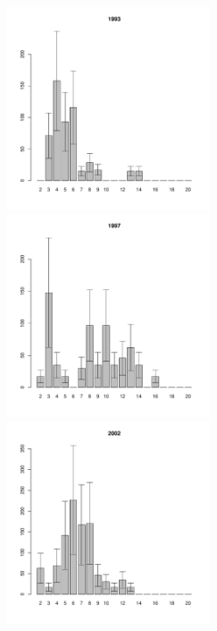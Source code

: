 \begin{figure}[hp]
\begin{minipage}[b]{.3\linewidth}
\begin{center}
	\end{center}
	\end{minipage}
	\begin{minipage}[b]{.3\linewidth}
	\begin{center}
	\includegraphics[width=60mm]{../White_Sea/Luvenga_II_razrez/high_beatch2_1993_.pdf}
	\end{center}
	\end{minipage}
	\hfil %
	\begin{minipage}[b]{.3\linewidth}
	\begin{center}
	\includegraphics[width=60mm]{../White_Sea/Luvenga_II_razrez/high_beatch2_1997_.pdf}
	\end{center}
	\end{minipage}
	\hfil %
	\begin{minipage}[b]{.3\linewidth}
	\begin{center}
	\includegraphics[width=60mm]{../White_Sea/Luvenga_II_razrez/high_beatch2_2002_.pdf}
	\end{center}
	\end{minipage}



\end{figure}
